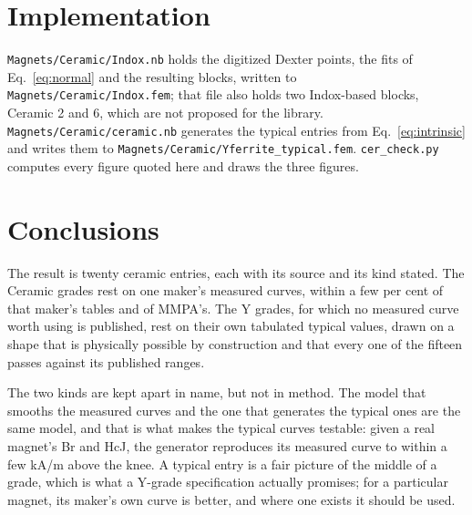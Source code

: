 \documentclass[
  11pt,
]{article}
\begin{document}
\section{Implementation}\label{implementation}

\texttt{Magnets/Ceramic/Indox.nb} holds the digitized Dexter points, the fits of Eq.~\eqref{eq:normal} and the resulting blocks, written to \texttt{Magnets/Ceramic/Indox.fem}; that file also holds two Indox-based blocks, Ceramic 2 and 6, which are not proposed for the library. \texttt{Magnets/Ceramic/ceramic.nb} generates the typical entries from Eq.~\eqref{eq:intrinsic} and writes them to \texttt{Magnets/Ceramic/Yferrite\_typical.fem}. \texttt{cer\_check.py} computes every figure quoted here and draws the three figures.

\section{Conclusions}\label{conclusions}

The result is twenty ceramic entries, each with its source and its kind stated. The Ceramic grades rest on one maker's measured curves, within a few per cent of that maker's tables and of MMPA's. The Y grades, for which no measured curve worth using is published, rest on their own tabulated typical values, drawn on a shape that is physically possible by construction and that every one of the fifteen passes against its published ranges.

The two kinds are kept apart in name, but not in method. The model that smooths the measured curves and the one that generates the typical ones are the same model, and that is what makes the typical curves testable: given a real magnet's Br and HcJ, the generator reproduces its measured curve to within a few kA/m above the knee. A typical entry is a fair picture of the middle of a grade, which is what a Y-grade specification actually promises; for a particular magnet, its maker's own curve is better, and where one exists it should be used.
\end{document}
